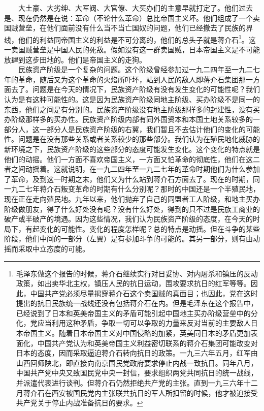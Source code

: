 \documentclass[cn,11pt,chinese]{elegantbook}
\begin{document}
　　大土豪、大劣绅、大军阀、大官僚、大买办们的主意早就打定了。他们过去是、现在仍然是在说：革命（不论什么革命）总比帝国主义坏。他们组成了一个卖国贼营垒，在他们面前没有什么当不当亡国奴的问题，他们已经撤去了民族的界线，他们的利益同帝国主义的利益是不可分离的，他们的总头子就是蒋介石\footnote[9]{ 毛泽东做这个报告的时候，蒋介石继续实行对日妥协、对内屠杀和镇压的反动政策，如出卖华北主权，镇压人民的抗日运动，围攻要求抗日的红军等等。因此，中国共产党必须尽量揭穿蒋介石这个卖国贼的真面目；也因此，党在这时提出的抗日民族统一战线还没有包括蒋介石在内。但是毛泽东在这个报告中，已经说到了日本和英美帝国主义的矛盾可能引起中国地主买办阶级营垒中的分化，党应当利用这种矛盾，争取一切可以争取的力量来反对当前的主要敌人日本帝国主义。随着日本帝国主义对中国侵略的加紧，英美同日本的矛盾更加表面化，中国共产党认为和英美帝国主义利益密切联系的蒋介石集团可能改变对日本的态度，因而采取逼迫蒋介石转向抗日的政策。一九三六年五月，红军由山西回师陕北，即直接向南京国民党政府要求停止内战一致抗日。同年八月，中国共产党中央又致国民党中央一封信，要求组织两党共同抗日的统一战线，并派遣代表进行谈判。但蒋介石仍然拒绝共产党的主张。直到一九三六年十二月蒋介石在西安被国民党内主张联共抗日的军人所扣留的时候，他才被迫接受共产党关于停止内战准备抗日的要求。}。这一卖国贼营垒是中国人民的死敌。假如没有这一群卖国贼，日本帝国主义是不可能放肆到这步田地的。他们是帝国主义的走狗。\\
　　民族资产阶级是一个复杂的问题。这个阶级曾经参加过一九二四年至一九二七年的革命，随后又为这个革命的火焰所吓坏，站到人民的敌人即蒋介石集团那一方面去了。问题是在今天的情况下，民族资产阶级有没有发生变化的可能性呢？我们认为是有这种可能性的。这是因为民族资产阶级同地主阶级、买办阶级不是同一的东西，他们之间是有分别的。民族资产阶级没有地主阶级那样多的封建性，没有买办阶级那样多的买办性。民族资产阶级内部有同外国资本和本国土地关系较多的一部分人，这一部分人是民族资产阶级的右翼，我们暂且不去估计他们的变化的可能性。问题是在没有那些关系或者关系较少的那些部分。我们认为在殖民地化威胁的新环境之下，民族资产阶级的这些部分的态度可能发生变化。这个变化的特点就是他们的动摇。他们一方面不喜欢帝国主义，一方面又怕革命的彻底性，他们在这二者之间动摇着。这就说明，在一九二四年至一九二七年的革命时期他们为什么参加了革命，及到这一时期之末，他们又为什么站到蒋介石方面去了。现在的时期，同一九二七年蒋介石叛变革命的时期有什么分别呢？那时的中国还是一个半殖民地，现在正在走向殖民地。九年以来，他们抛弃了自己的同盟者工人阶级，和地主买办阶级做朋友，得了什么好处没有呢？没有什么好处，得到的只不过是民族工商业的破产或半破产的境遇。因为这些情况，我们认为民族资产阶级的态度，在今天的时局下，有起变化的可能性。变化的程度怎样呢？总的特点是动摇。但在斗争的某些阶段，他们中间的一部分（左翼）是有参加斗争的可能的。其另一部分，则有由动摇而采取中立态度的可能。\\
\end{document}
